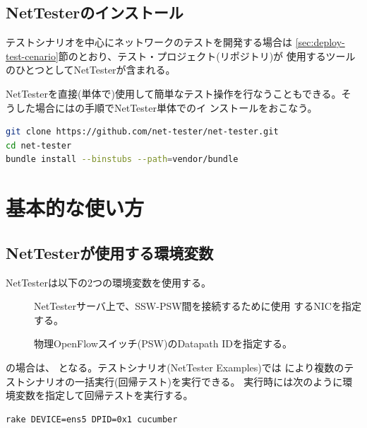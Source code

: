   \subsection{NetTesterのインストール}

テストシナリオを中心にネットワークのテストを開発する場合は
\ref{sec:deploy-test-cenario}節のとおり、テスト・プロジェクト(リポジトリ)が
使用するツールのひとつとしてNetTesterが含まれる。

NetTesterを直接(単体で)使用して簡単なテスト操作を行なうこともできる。そ
うした場合にはの手順でNetTester単体でのイ
ンストールをおこなう。

\begin{lstlisting}[language=sh,caption=NetTesterのインストール,label=lst:install-nettester]
git clone https://github.com/net-tester/net-tester.git
cd net-tester
bundle install --binstubs --path=vendor/bundle
\end{lstlisting}

 \section{基本的な使い方}
 \label{sec:basic-usage}

  \subsection{NetTesterが使用する環境変数}
  \label{sec:nettester-envvar}

NetTesterは以下の2つの環境変数を使用する。
\begin{description}
 \item[] NetTesterサーバ上で、SSW-PSW間を接続するために使用
            するNICを指定する。
 \item[] 物理OpenFlowスイッチ(PSW)のDatapath IDを指定する。
\end{description}

の場合は、
となる。テストシナリオ(NetTester Examples)では
により複数のテストシナリオの一括実行(回帰テスト)を実行できる。
実行時には次のように環境変数を指定して回帰テストを実行する。
\begin{lstlisting}[title=回帰テスト実行時の環境変数指定]
rake DEVICE=ens5 DPID=0x1 cucumber
\end{lstlisting}

